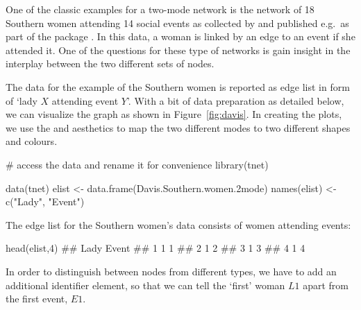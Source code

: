 One of the classic examples for a two-mode network is the network of 18 Southern women attending 14 social events as collected by \citet{davis} and published e.g.\ as part of the  package \citep{tnet}. In this data, a woman is linked by an edge to an event if she attended it. 
One of the questions for these type of networks is gain insight in the interplay between the two different sets of nodes. 

The data for the example of the Southern women is reported as edge list in form of `lady $X$ attending event $Y$'.
With a bit of data preparation as detailed below, we can visualize the graph as shown in Figure~\ref{fig:davis}. In creating the plots, we use the  and  aesthetics to map the two different modes to two different shapes and colours. 

\begin{example}
# access the data and rename it for convenience
library(tnet)

data(tnet)
elist <- data.frame(Davis.Southern.women.2mode)
names(elist) <- c("Lady", "Event")


\end{example}

\noindent
The edge list for the Southern women's data consists of women attending events:
\begin{example}
head(elist,4)
##   Lady Event
## 1    1     1
## 2    1     2
## 3    1     3
## 4    1     4


\end{example}
\noindent
In order to distinguish between nodes from different types, we have to add an additional identifier element, so that we can tell the `first' woman $L1$ apart from the first event, $E1$.


